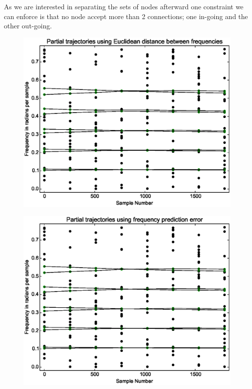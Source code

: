 \documentclass[letterpaper,12pt]{report}
\begin{document}
As we are interested in separating the sets of nodes afterward one constraint we
can enforce is that no node accept more than 2 connections; one in-going
and the other out-going.
\begin{figure}
    \centering
    \includegraphics[width=\textwidth]{../experiment_2/plots/lp_ptrack_eudist.eps}
\end{figure}
\begin{figure}
    \centering
    \includegraphics[width=\textwidth]{../experiment_2/plots/lp_ptrack_fpredict.eps}
\end{figure}
%
\end{document}
